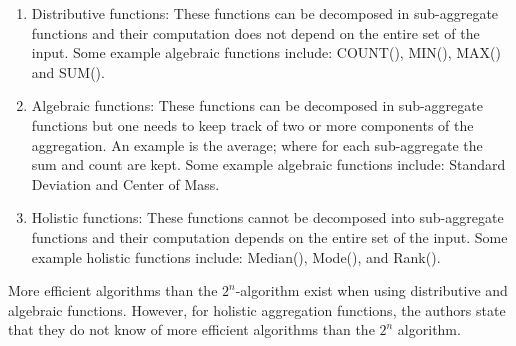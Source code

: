 \documentclass[]{article}
\begin{document}
\begin{enumerate}
    \item Distributive functions: These functions can be decomposed in sub-aggregate functions and their computation does not
    depend on the entire set of the input. Some example algebraic functions include: COUNT(), MIN(), MAX() and SUM().
    \item Algebraic functions: These functions can be decomposed in sub-aggregate functions but one needs to keep track of two
    or more components of the aggregation. An example is the average; where for each sub-aggregate the sum and count are kept.
    Some example algebraic functions include: Standard Deviation and Center of Mass.
    \item Holistic functions: These functions cannot be decomposed into sub-aggregate functions and their computation depends
    on the entire set of the input. Some example holistic functions include: Median(), Mode(), and Rank(). 
\end{enumerate}
More efficient algorithms than the $2^n$-algorithm exist when using distributive and algebraic functions. However, for
holistic aggregation functions, the authors state that they do not know of more efficient algorithms than the $2^n$ algorithm.



\end{document}
